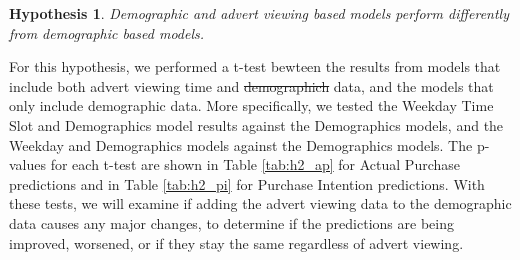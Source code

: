 \documentclass[review]{elsarticle}
\newtheorem{hyp}{Hypothesis}
\providecommand{\DIFaddtex}[1]{{\protect\color{blue}\uwave{#1}}} %
\providecommand{\DIFdeltex}[1]{{\protect\color{red}\sout{#1}}}                      %
\providecommand{\DIFaddbegin}{} %
\providecommand{\DIFaddend}{} %
\providecommand{\DIFdelbegin}{} %
\providecommand{\DIFdelend}{} %
\providecommand{\DIFadd}[1]{\texorpdfstring{\DIFaddtex{#1}}{#1}} %
\providecommand{\DIFdel}[1]{\texorpdfstring{\DIFdeltex{#1}}{}} %
\newcommand{\DIFscaledelfig}{0.5}
\newlength{\DIFdelgraphicswidth} %
\newlength{\DIFdelgraphicsheight} %
\newcommand{\DIFaddincludegraphics}[2][]{{\color{blue}\fbox{\DIFOincludegraphics[#1]{#2}}}} %
\newcommand{\DIFdelincludegraphics}[2][]{%
\sbox{\DIFdelgraphicsbox}{\DIFOincludegraphics[#1]{#2}}%
\settoboxwidth{\DIFdelgraphicswidth}{\DIFdelgraphicsbox} %
\settoboxtotalheight{\DIFdelgraphicsheight}{\DIFdelgraphicsbox} %
\scalebox{\DIFscaledelfig}{%
\parbox[b]{\DIFdelgraphicswidth}{\usebox{\DIFdelgraphicsbox}\\[-\baselineskip] \rule{\DIFdelgraphicswidth}{0em}}\llap{\resizebox{\DIFdelgraphicswidth}{\DIFdelgraphicsheight}{%
\setlength{\unitlength}{\DIFdelgraphicswidth}%
\begin{picture}(1,1)%
\thicklines\linethickness{2pt} %
{\color[rgb]{1,0,0}\put(0,0){\framebox(1,1){}}}%
{\color[rgb]{1,0,0}\put(0,0){\line( 1,1){1}}}%
{\color[rgb]{1,0,0}\put(0,1){\line(1,-1){1}}}%
\end{picture}%
}\hspace*{3pt}}} %
} %
\DeclareRobustCommand{\DIFaddbegin}{\DIFOaddbegin \let\includegraphics\DIFaddincludegraphics} %
\DeclareRobustCommand{\DIFaddend}{\DIFOaddend \let\includegraphics\DIFOincludegraphics} %
\DeclareRobustCommand{\DIFdelbegin}{\DIFOdelbegin \let\includegraphics\DIFdelincludegraphics} %
\DeclareRobustCommand{\DIFdelend}{\DIFOaddend \let\includegraphics\DIFOincludegraphics} %
\begin{document}
\begin{hyp}
\label{hyp:2}
Demographic and advert viewing based models perform differently from demographic based models.
\end{hyp}

For this hypothesis, we performed a t-test bewteen the results from models that include both advert viewing time and \DIFdelbegin \DIFdel{demographich }\DIFdelend \DIFaddbegin \DIFadd{demographic }\DIFaddend data, and the models that only include demographic data. More specifically, we tested the Weekday Time Slot and Demographics model results against the Demographics models, and the Weekday and Demographics models against the Demographics models. The p-values for each t-test are shown in Table \ref{tab:h2_ap} for Actual Purchase predictions and in Table \ref{tab:h2_pi} for Purchase Intention predictions. With these tests, we will examine if adding the advert viewing data to the demographic data causes any major changes, to determine if the predictions are being improved, worsened, or if they stay the same regardless of advert viewing.
\end{document}
